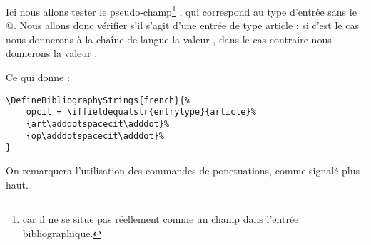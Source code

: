 Ici nous allons tester le pseudo-champ\footnote{ car il ne se situe pas réellement comme un champ dans l'entrée bibliographique.} , qui correspond au type d'entrée sans le @. Nous allons donc vérifier s'il s'agit d'une entrée de type article : si c'est le cas nous donnerons à la chaîne de langue la valeur  ,  dans le cas contraire nous donnerons la valeur .

Ce qui donne : 

\begin{verbatim}
\DefineBibliographyStrings{french}{%
	opcit = \iffieldequalstr{entrytype}{article}%
	{art\adddotspacecit\adddot}%
	{op\adddotspacecit\adddot}%
}
\end{verbatim}

On remarquera l'utilisation des commandes de ponctuations, comme signalé plus haut.


	